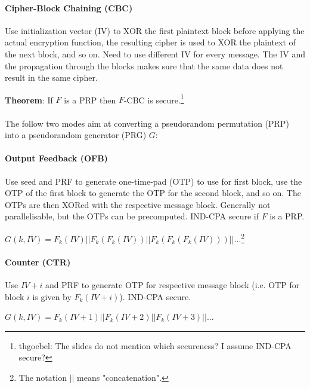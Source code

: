 \paragraph{Cipher-Block Chaining (CBC)} Use initialization vector (IV) to XOR the first plaintext block before applying the actual encryption function, the resulting cipher is used to XOR the plaintext of the next block, and so on. Need to use different IV for every message. The IV and the propagation through the blocks makes sure that the same data does not result in the same cipher.

\textbf{Theorem}: If $F$ is a PRP then $F$-CBC is secure.\footnote{thgoebel: The slides do not mention which secureness? I assume IND-CPA secure?}
\\ \\
The follow two modes aim at converting a pseudorandom permutation (PRP) into a pseudorandom generator (PRG) $G$:

\paragraph{Output Feedback (OFB)} Use seed and PRF to generate one-time-pad (OTP) to use for first block, use the OTP of the first block to generate the OTP for the second block, and so on. The OTPs are then XORed with the respective message block. Generally not parallelisable, but the OTPs can be precomputed. IND-CPA secure if $F$ is a PRP.

$G(k, IV) = F_k(IV) || F_k(F_k(IV)) || F_k(F_k(F_k(IV))) || ... $\footnote{The notation $||$ means "concatenation".}

\paragraph{Counter (CTR)} Use $IV+i$ and PRF to generate OTP for respective message block (i.e. OTP for block $i$ is given by $F_k(IV + i)$). IND-CPA secure.

$G(k, IV) = F_k(IV+1) || F_k(IV+2) || F_k(IV+3) || ... $

